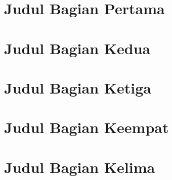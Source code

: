 \documentclass{wileySix}
\begin{document}

\chapter{Judul Bagian Pertama}


\chapter{Judul Bagian Kedua}


\chapter{Judul Bagian Ketiga}


\chapter{Judul Bagian Keempat}


\chapter{Judul Bagian Kelima}



 



\printindex


\end{document}
